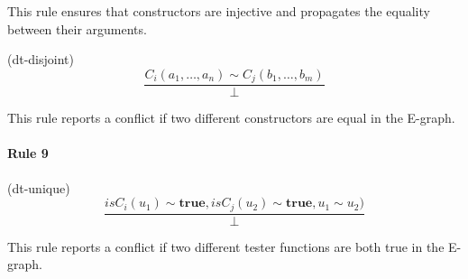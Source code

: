 \documentclass[a4paper]{article}
\newcommand\true{\mathbf{true}}
\newcommand\isC{\mathit{isC}}
\begin{document}
This rule ensures that constructors are injective and propagates the
equality between their arguments.


(dt-disjoint)
\[
\frac{C_i(a_1,\dots,a_n) \sim C_j(b_1,\dots,b_m)}{\bot}
\]

This rule reports a conflict if two different constructors are equal in
the E-graph.

\paragraph{Rule 9} (dt-unique)
\[
\frac{\isC_i(u_1) \sim \true, \isC_j(u_2)\sim \true, u_1\sim u_2)}{\bot}
\]

This rule reports a conflict if two different tester functions are both
true in the E-graph.
\end{document}
